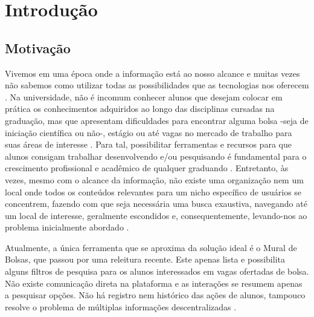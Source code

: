 \documentclass[cic,tc]{iiufrgs}
\begin{document}

\tableofcontents

\chapter{Introdução}

\section{Motivação}
\label{introducaoMotivacao}

Vivemos em uma época onde a informação está ao nosso alcance e muitas vezes não sabemos como utilizar todas as possibilidades que as tecnologias nos oferecem \cite{anotherNodeArticle} \cite{impactInternetArticle}. Na universidade, não é incomum conhecer alunos que desejam colocar em prática os conhecimentos adquiridos ao longo das disciplinas cursadas na graduação, mas que apresentam dificuldades para encontrar alguma bolsa -seja de iniciação científica ou não-,
estágio ou até vagas no mercado de trabalho para suas áreas de interesse \cite{internetLibDesArticle}. Para tal, possibilitar ferramentas e recursos para que alunos consigam trabalhar desenvolvendo e/ou pesquisando é fundamental para o crescimento profissional e acadêmico de qualquer graduando \cite{teachMediaArticle}. Entretanto, às vezes, mesmo com o alcance da informação, não existe uma organização nem um local onde todos os conteúdos relevantes para um nicho específico de usuários se concentrem, fazendo com que seja necessária uma busca exaustiva, navegando até um local de interesse, geralmente escondidos e, consequentemente, levando-nos ao problema inicialmente abordado \cite{socConnectArticle}.

Atualmente, a única ferramenta que se aproxima da solução ideal é o Mural de Bolsas, que passou por uma releitura recente. Este apenas lista e possibilita alguns filtros de pesquisa para os alunos interessados em vagas ofertadas de bolsa. Não existe comunicação direta na plataforma e as interações se resumem apenas a pesquisar opções. Não há registro nem histórico das ações de alunos, tampouco resolve o problema de múltiplas informações descentralizadas \cite{socialChallengeArticle}.
\end{document}
